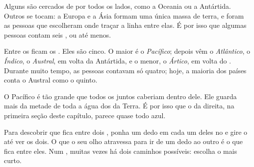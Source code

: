 \begin{remark}\label{rem:g3:continents-and-oceans:where}
Alguns  são cercados de  por todos os lados, como a Oceania
ou a Antártida. Outros se tocam: a Europa e a Ásia formam uma única massa
de terra, e foram as pessoas que escolheram onde traçar a linha entre elas.
É por isso que algumas pessoas contam seis , ou até menos.
\end{remark}

Entre os  ficam os . Eles são cinco. O maior é o
\emph{ Pacífico}; depois vêm o \emph{ Atlântico}, o
\emph{ Índico}, o \emph{ Austral}, em volta da Antártida, e o
menor, o \emph{ Ártico}, em volta do . Durante muito
tempo, as pessoas contavam só quatro; hoje, a maioria dos países conta o
 Austral como o quinto.

\begin{example}\label{ex:g3:continents-and-oceans:pacific}
O  Pacífico é tão grande que todos os  juntos caberiam
dentro dele. Ele guarda mais da metade de toda a água dos  da
Terra. É por isso que o  da direita, na primeira seção deste
capítulo, parece quase todo azul.
\end{example}

\begin{method}\label{met:g3:continents-and-oceans:between}
Para descobrir que  fica entre dois , ponha um dedo em
cada um deles no  e gire o  até ver os dois. O  que o seu
olho atravessa para ir de um dedo ao outro é o que fica entre eles. Num
, muitas vezes há dois caminhos possíveis: escolha o mais curto.
\end{method}

